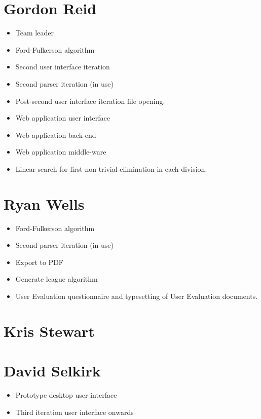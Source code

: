 \section{Gordon Reid}

\begin{itemize}
\item Team leader
\item Ford-Fulkerson algorithm
\item Second user interface iteration
\item Second parser iteration (in use)
\item Post-second user interface iteration file opening.
\item Web application user interface
\item Web application back-end
\item Web application middle-ware
\item Linear search for first non-trivial elimination in each division.
\end{itemize}

\section{Ryan Wells}

\begin{itemize}
\item Ford-Fulkerson algorithm
\item Second parser iteration (in use)
\item Export to PDF
\item Generate league algorithm
\item User Evaluation questionnaire and typesetting of User Evaluation documents.
\end{itemize}

\section{Kris Stewart}

\section{David Selkirk}

\begin{itemize}
\item Prototype desktop user interface
\item Third iteration user interface onwards
\end{itemize}

